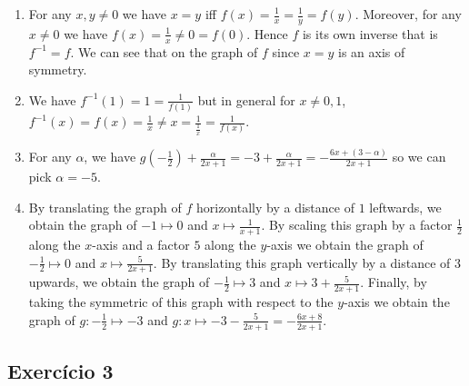 \begin{enumerate}
\item For any $x,y \neq 0$ we have $x = y$ iff
  $f(x) = \frac{1}{x} = \frac{1}{y} = f(y)$.
  Moreover, for any $x \neq 0$ we have $f(x) = \frac{1}{x} \neq 0 = f(0)$.
  Hence $f$ is its own inverse that is $f^{-1} = f$. We can see that on the
  graph of $f$ since $x=y$ is an axis of symmetry.
\item
  We have $f^{-1}(1) = 1 = \frac{1}{f(1)}$ but in general for
  $x \neq 0,1$, $f^{-1}{(x)} = f(x) = \frac{1}{x} \neq x =
  \frac{1}{\frac{1}{x}} = \frac{1}{f(x)}$.
\item For any $\alpha$, we have
  $g\left(-\frac{1}{2}\right) + \frac{\alpha}{2x+1} =
  -3 + \frac{\alpha}{2x+1} = -\frac{6x+{(3-\alpha)}}{2x+1}$
   so we can pick $\alpha = -5$.
 \item
   By translating the graph of $f$ horizontally by a distance of $1$
   leftwards, we obtain the graph of
   $-1 \mapsto 0$ and $x \mapsto \frac{1}{x+1}$. By scaling
   this graph by a factor $\frac{1}{2}$ along the $x$-axis
   and a factor $5$ along the $y$-axis we obtain the
   graph of $-\frac{1}{2} \mapsto 0$ and
   $x \mapsto \frac{5}{2x+1}$. By translating this graph vertically by a
   distance of $3$ upwards, we obtain the graph of
   $-\frac{1}{2} \mapsto 3$ and
   $x \mapsto 3 + \frac{5}{2x+1}$. Finally, by taking the symmetric of this
   graph with respect to the $y$-axis we obtain the graph of
   $g: -\frac{1}{2} \mapsto -3$ and $g: x \mapsto -3 - \frac{5}{2x+1} =
   -\frac{6x+8}{2x+1}$.
\end{enumerate}

\subsection*{Exercício 3}


